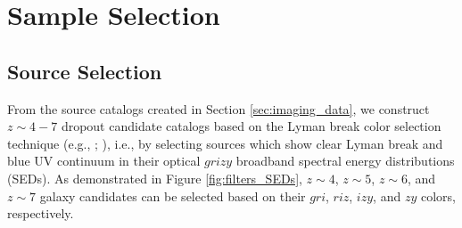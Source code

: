 \documentclass[]{pasj01}
\begin{document}
\section{Sample Selection} \label{sec:sample_selection}



\subsection{Source Selection} \label{sec:source_selection}

From the source catalogs created in Section \ref{sec:imaging_data}, 
we construct $z\sim 4-7$ dropout candidate catalogs 
based on the Lyman break color selection technique 
(e.g., \cite{1996ApJ...462L..17S}; \cite{2002ARA&A..40..579G}), 
i.e., by selecting sources which show clear 
Lyman break and blue UV continuum 
in their optical $grizy$ broadband spectral energy distributions (SEDs). 
%
As demonstrated in Figure \ref{fig:filters_SEDs}, 
$z \sim 4$, $z \sim 5$, $z \sim 6$, and $z \sim 7$ galaxy candidates can be selected 
based on their $gri$, $riz$, $izy$, and $zy$ colors, respectively.   
\end{document}
